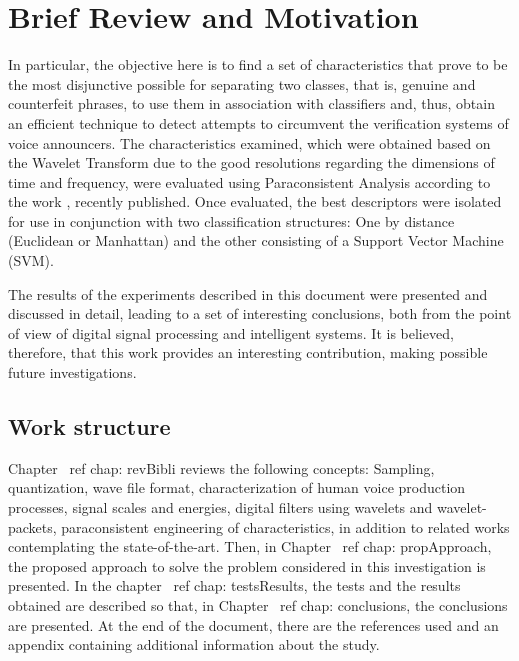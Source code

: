 \section{Brief Review and Motivation}
\label{review}
		\par In particular, the objective here is to find a set of characteristics that prove to be the most disjunctive possible for separating two classes, that is, genuine and counterfeit phrases, to use them in association with classifiers and, thus, obtain an efficient technique to detect attempts to circumvent the verification systems of voice announcers. The characteristics examined, which were obtained based on the Wavelet Transform due to the good resolutions regarding the dimensions of time and frequency, were evaluated using Paraconsistent Analysis according to the work \cite{8588433}, recently published. Once evaluated, the best descriptors were isolated for use in conjunction with two classification structures: One by distance (Euclidean or Manhattan) and the other consisting of a Support Vector Machine (SVM).

		\par The results of the experiments described in this document were presented and discussed in detail, leading to a set of interesting conclusions, both from the point of view of digital signal processing and intelligent systems. It is believed, therefore, that this work provides an interesting contribution, making possible future investigations. 
		
		\subsection{Work structure}
		\par Chapter \ ref {chap: revBibli} reviews the following concepts: Sampling, quantization, wave file format, characterization of human voice production processes, signal scales and energies, digital filters using wavelets and wavelet-packets, paraconsistent engineering of characteristics, in addition to related works contemplating the state-of-the-art. Then, in Chapter \ ref {chap: propApproach}, the proposed approach to solve the problem considered in this investigation is presented. In the chapter \ ref {chap: testsResults}, the tests and the results obtained are described so that, in Chapter \ ref {chap: conclusions}, the conclusions are presented. At the end of the document, there are the references used and an appendix containing additional information about the study.